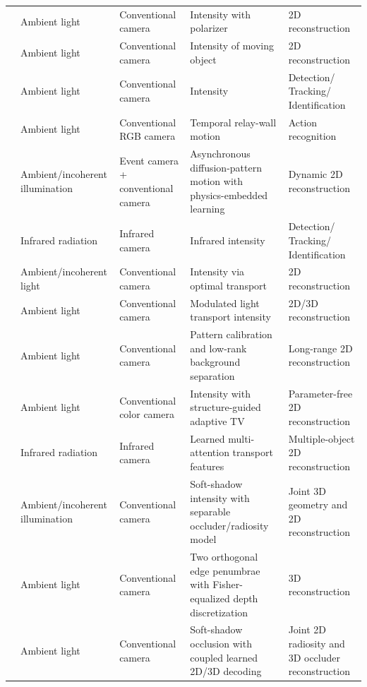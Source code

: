 \begin{table}[!t]
{\begin{tabular}{m{2.5cm}m{3.5cm}m{3cm}m{4cm}m{3cm}}
   \cite{tanakaPolarizedNonLineofSightImaging2020} & Ambient light & Conventional camera & Intensity with polarizer &  2D reconstruction\\%
   \cite{boumanTurningCornersCameras2017} & Ambient light & Conventional camera & Intensity of moving object &  2D reconstruction\\%
   \cite{boumanTurningCornersCameras2017} & Ambient light & Conventional camera & Intensity &  Detection/ Tracking/ Identification\\%
   \cite{sunAdaptiveMotionNLOS2025} & Ambient light & Conventional RGB camera & Temporal relay-wall motion & Action recognition\\%
   \cite{wangEventEnhancedPassiveNLOS2024} & Ambient/incoherent illumination & Event camera + conventional camera & Asynchronous diffusion-pattern motion with physics-embedded learning & Dynamic 2D reconstruction\\%
   \cite{8747343} & Infrared radiation & Infrared camera & Infrared intensity &  Detection/ Tracking/ Identification\\%
   \cite{geng2022passive} & Ambient/incoherent light & Conventional camera & Intensity via optimal transport &  2D reconstruction\\%
   \cite{zhang2025passive} & Ambient light & Conventional camera & Modulated light transport intensity &  2D/3D reconstruction\\%
    \cite{zhouPassiveNLOS10m2025} & Ambient light & Conventional camera & Pattern calibration and low-rank background separation & Long-range 2D reconstruction\\%
    \cite{zhangStructureGuidedATV2026} & Ambient light & Conventional color camera & Intensity with structure-guided adaptive TV & Parameter-free 2D reconstruction\\%
    \cite{chenMultipleObjectPassiveNLOS2026} & Infrared radiation & Infrared camera & Learned multi-attention transport features & Multiple-object 2D reconstruction\\%
    \cite{rajiSNLLSComputationalPersicopy2024,rajiSoftShadowDiffusion2024} & Ambient/incoherent illumination & Conventional camera & Soft-shadow intensity with separable occluder/radiosity model & Joint 3D geometry and 2D reconstruction\\%
    \cite{czajkowskiFisherTERI2024} & Ambient light & Conventional camera & Two orthogonal edge penumbrae with Fisher-equalized depth discretization & 3D reconstruction\\%
    \cite{rajiMDUNet2026} & Ambient light & Conventional camera & Soft-shadow occlusion with coupled learned 2D/3D decoding & Joint 2D radiosity and 3D occluder reconstruction\\%

   \hline
   \end{tabular}}{}
   \end{table}%

